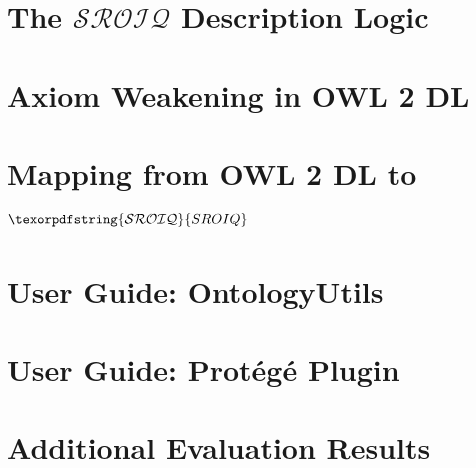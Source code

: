\documentclass[10pt,a4paper]{report}
\theoremstyle{plain}
\theoremstyle{definition}
\theoremstyle{remark}
\newcommand{\SROIQ}{\ensuremath{\texorpdfstring{\mathcal{SROIQ}}{SROIQ}}\xspace}
\begin{document}



\printbibliography

\appendix

\chapter{The \texorpdfstring{$\mathcal{SROIQ}$}{SROIQ} Description Logic} \label{sroiq-appendix}



\chapter{Axiom Weakening in OWL 2 DL} \label{weakening-owl-2-dl}



\chapter{Mapping from OWL 2 DL to \SROIQ} \label{owl-to-sroiq}



\chapter{User Guide: OntologyUtils} \label{guide-prototype}



\chapter{User Guide: Protégé Plugin} \label{guide-plugin}



\chapter{Additional Evaluation Results} \label{eval-appendix}


\end{document}
